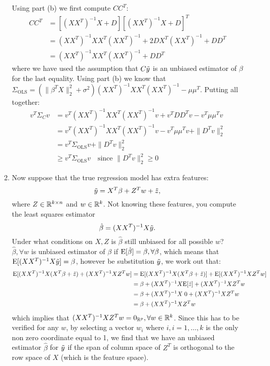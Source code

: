 \documentclass[12pt,twoside]{article}
\begin{document}
\begin{enumerate}
\begin{enumerate}
   \medskip
   Using part (b) we first compute $CC^T$:
   \begin{align*}
   	CC^T	&=	[(XX^T)^{-1}X+D] [(XX^T)^{-1}X+D]^T	\\
			&=	(XX^T)^{-1}X X^T (XX^T)^{-1} + 2 D X^T (XX^T)^{-1} + DD^T \\
			&=	(XX^T)^{-1}X X^T (XX^T)^{-1}  + DD^T 
   \end{align*}
    where we have used the assumption that $C\tilde{  y }$ is an unbiased estimator of $\beta$ for the last equality.
    Using part (b) we know that $\Sigma_{\text{OLS}} =  (\|\beta^T X\|_2^2 + \sigma^2)  (XX^T)^{-1}X X^T (XX^T)^{-1} - \mu\mu^T$.
    Putting all together:
    \begin{align*}
    	v^T\Sigma_Cv 	&=	v^T (XX^T)^{-1}X X^T (XX^T)^{-1} v + v^T DD^T v - v^T \mu\mu^T v \\
				&=	v^T (XX^T)^{-1}X X^T (XX^T)^{-1} v - v^T \mu\mu^T v + \|D^T v\|_2^2 \\
				&=	 v^T\Sigma_{\text{OLS}}v + \|D^T v\|_2^2 \\
				&\ge	 v^T\Sigma_{\text{OLS}}v \text{ ~ since } \|D^T v\|_2^2 \ge 0
   \end{align*}
      
      
  \item Now suppose that the true regression model has extra features:
    $$\tilde{  y } = X^T\beta + Z^T w + \tilde{  z },$$
    where $Z\in \mathbb{R}^{k\times n}$ and $w\in\mathbb{R}^k$.  Not knowing
    these features, you compute the least squares estimator
    $$\hat{\beta} = (XX^T)^{-1}X\tilde{  y }.$$
    Under what conditions on $X,Z$ is $\hat{\beta}$ still unbiased for all
    possible $w$?\\
    
    \medskip
     $\hat{\beta}, \forall w$ is unbiased estimator of $\beta$ if $\mathrm{E}[\hat{\beta}] = \beta, \forall \beta$, which means that
     $\mathrm{E}[ (XX^T)^{-1}X\tilde{  y } ] = \beta$, however be substitution $\tilde{  y }$, we work out that: 
      \begin{align*}
      	\mathrm{E}[ (XX^T)^{-1}X  (X^T \beta + \tilde{  z }) + (XX^T)^{-1}X  Z^T w]	&=	\mathrm{E}[ (XX^T)^{-1}X  (X^T \beta + \tilde{  z })] + \mathrm{E}[(XX^T)^{-1}X  Z^T w] \\
												&=	 \beta + (XX^T)^{-1}X \mathrm{E}[\tilde{  z }]	+  (XX^T)^{-1}X  Z^T w \\
												&=	\beta + (XX^T)^{-1}X \; 0 + (XX^T)^{-1}X  Z^T w \\
												&= 	\beta + (XX^T)^{-1}X  Z^T w 
      \end{align*}
      which implies that $(XX^T)^{-1}X  Z^T w = 0_{\mathbb{R}^p}, \forall w \in \mathbb{R}^k$.
      Since this has to be verified for any $w$,
      by selecting a vector $w_i$ where $i, i=1, \ldots, k$ is the only non zero coordinate equal to 1, we find that we have an unbiased estimator $\hat{\beta}$ for $\tilde{  y }$ 
      if the span of column space of $Z^T$ is orthogonal to the row space of $X$ (which is the feature space).
    

\end{enumerate}
\end{enumerate}
\end{document}
